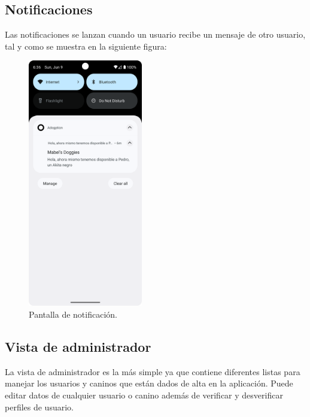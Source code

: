 \documentclass[a4paper, 12pt]{article}
\begin{document}
\newpage
\subsection*{Notificaciones}

Las notificaciones se lanzan cuando un usuario recibe un mensaje de otro usuario, tal y como se muestra en la siguiente figura:

\begin{figure}[H]
	\begin{center}
		{\includegraphics[width=5cm]{app/Notifications.png}\par}
		\caption{Pantalla de notificación.}
	\end{center}  
\end{figure}


\newpage
\subsection*{Vista de administrador}

La vista de administrador es la más simple ya que contiene diferentes listas para manejar los usuarios y caninos que están dados de alta en la aplicación. Puede editar datos de cualquier usuario o canino además de verificar y desverificar perfiles de usuario.
\end{document}
